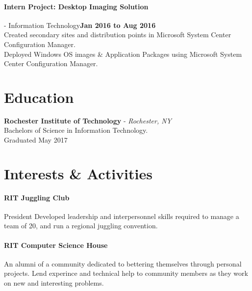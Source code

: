 \documentclass[10pt]{article}
\begin{document}
\paragraph{Intern Project: Desktop Imaging Solution} - Information Technology\hfill{\bf Jan 2016 to Aug 2016}\\
Created secondary sites and distribution points in Microsoft System Center Configuration Manager.\\
Deployed Windows OS images \& Application Packages using Microsoft System Center Configuration Manager.
\section*{\large Education}
{\bf Rochester Institute of Technology} - {\it Rochester, NY}\\
Bachelors of Science in Information Technology.\\
Graduated May 2017
\section*{\large Interests \& Activities}
\paragraph{\bf RIT Juggling Club} President
Developed leadership and interpersonnel skills required to manage a team of 20, and run a regional juggling convention.
\paragraph{\bf RIT Computer Science House}
An alumni of a community dedicated to bettering themselves through personal projects. Lend experince and technical help to community members as they work on new and interesting problems.
\end{document}

